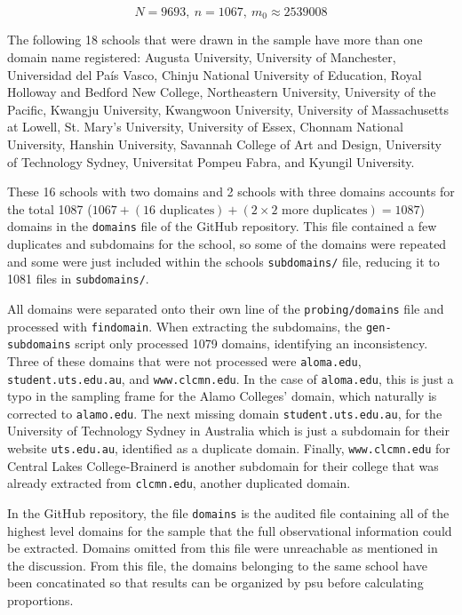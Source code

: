 \documentclass{article}
\theoremstyle{definition}
\begin{document}
\begin{flushleft}
\begin{multicols}{2}
$$
	N=9693, \ n=1067, \ m_0\approx2539008
$$

The following 18 schools that were drawn in the sample
have more than one domain name registered:
Augusta University,
University of Manchester,
Universidad del País Vasco,
Chinju National University of Education,
Royal Holloway and Bedford New College,
Northeastern University,
University of the Pacific,
Kwangju University,
Kwangwoon University,
University of Massachusetts at Lowell,
St. Mary's University,
University of Essex,
Chonnam National University,
Hanshin University,
Savannah College of Art and Design,
University of Technology Sydney,
Universitat Pompeu Fabra, and
Kyungil University.

These 16 schools with two domains and 2 schools with three domains
accounts for the total 1087 ($1067 + (16 \textrm{ duplicates}) +
(2\times2 \textrm{ more duplicates}) = 1087$) domains in the
\texttt{domains} file of the GitHub repository. This file
contained a few duplicates and subdomains for the school,
so some of the domains were repeated and some were just included within
the schools \texttt{subdomains/} file, reducing it to 1081 files
in \texttt{subdomains/}.

All domains were separated onto their own line of the \texttt{probing/domains}
file and processed with \texttt{findomain}.
When extracting the subdomains, the \texttt{gen-subdomains}
script only processed 1079 domains, identifying an inconsistency.
Three of these domains that were not processed were \texttt{aloma.edu},
\texttt{student.uts.edu.au}, and \texttt{www.clcmn.edu}. In the case of
\texttt{aloma.edu}, this is just a typo in the sampling frame for the
Alamo Colleges' domain, which naturally is corrected to \texttt{alamo.edu}.
The next missing domain \texttt{student.uts.edu.au}, for the University
of Technology Sydney in Australia which is just a subdomain for their
website \texttt{uts.edu.au}, identified as a duplicate domain.
Finally, \texttt{www.clcmn.edu} for
Central Lakes College-Brainerd is another subdomain for their college
that was already extracted from \texttt{clcmn.edu}, another duplicated domain.

In the GitHub repository, the file \texttt{domains} is the audited file containing all
of the highest level domains for the sample that the full observational information could
be extracted. Domains omitted from this file were unreachable as mentioned in the discussion.
From this file, the domains belonging to the same school have been concatinated
so that results can be organized by psu before calculating proportions.



\end{multicols}
\end{flushleft}
\end{document}
